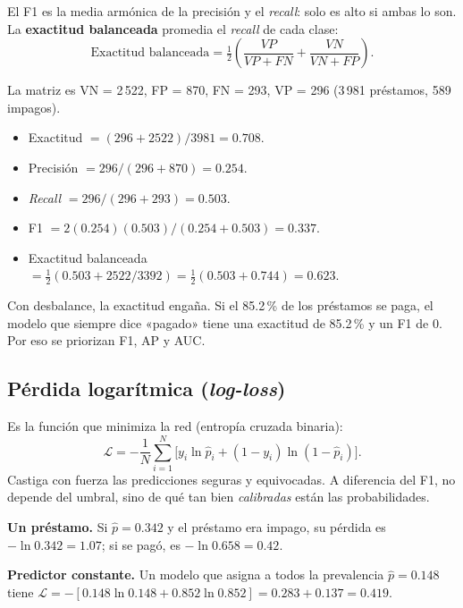 \documentclass[11pt,a4paper]{article}
\begin{document}
El F1 es la media armónica de la precisión y el \textit{recall}: solo es alto si ambas lo son. La \textbf{exactitud balanceada} promedia el \textit{recall} de cada clase:
\begin{equation}
\text{Exactitud balanceada} = \tfrac12\left(\frac{VP}{VP+FN} + \frac{VN}{VN+FP}\right).
\end{equation}

\begin{ejemplo}
La matriz es VN = 2\,522, FP = 870, FN = 293, VP = 296 (3\,981 préstamos, 589 impagos).
\begin{itemize}
\item Exactitud $=(296+2522)/3981 = 0.708$.
\item Precisión $=296/(296+870)=0.254$.
\item \textit{Recall} $=296/(296+293)=0.503$.
\item F1 $=2(0.254)(0.503)/(0.254+0.503)=0.337$.
\item Exactitud balanceada $=\tfrac12(0.503 + 2522/3392) = \tfrac12(0.503+0.744)=0.623$.
\end{itemize}
\end{ejemplo}

\begin{clave}
Con desbalance, la exactitud engaña. Si el 85.2\,\% de los préstamos se paga, el modelo que siempre dice «pagado» tiene una exactitud de 85.2\,\% y un F1 de 0. Por eso se priorizan F1, AP y AUC.
\end{clave}

\subsection{Pérdida logarítmica (\textit{log-loss})}

Es la función que minimiza la red (entropía cruzada binaria):
\begin{equation}
\mathcal{L} = -\frac1N\sum_{i=1}^{N}\Big[y_i\ln \hat p_i + (1-y_i)\ln(1-\hat p_i)\Big].
\end{equation}
Castiga con fuerza las predicciones seguras y equivocadas. A diferencia del F1, no depende del umbral, sino de qué tan bien \emph{calibradas} están las probabilidades.

\begin{ejemplo}
\textbf{Un préstamo.} Si $\hat p=0.342$ y el préstamo era impago, su pérdida es $-\ln 0.342 = 1.07$; si se pagó, es $-\ln 0.658 = 0.42$.

\textbf{Predictor constante.} Un modelo que asigna a todos la prevalencia $\hat p=0.148$ tiene
$\mathcal{L}= -[0.148\ln0.148+0.852\ln0.852] = 0.283+0.137 = 0.419$.
\end{ejemplo}
\end{document}
